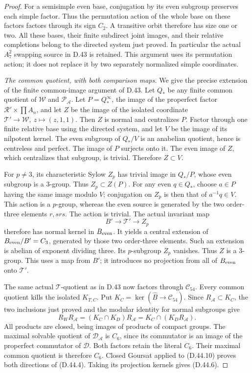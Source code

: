 \begin{proof}
For a semisimple even base, conjugation by its even
subgroup preserves each simple factor. Thus the
permutation action of the whole base on these factors
factors through its sign \(C_2\). A transitive orbit
therefore has size one or two. All these bases, their
finite subdirect joint images, and their relative
completions belong to the directed system just proved.
In particular the actual \(A_7^2\) swapping source in
D.43 is retained. This argument uses its permutation
action; it does not replace it by two separately
normalized simple coordinates.

\emph{The common quotient, with both comparison maps.}
We give the precise extension of the finite common-image
argument of D.43. Let \(Q_*\) be any finite common quotient
of \(\mathcal W\) and \(\mathcal P_{\mathscr A}\).
Let \(P=Q_*^\infty\), the image of the properfect
factor \(\mathcal R'\times\prod A_n\), and let \(Z\)
be the image of the isolated coordinate
\(\mathcal T'\to\mathcal W,\ z\mapsto(z,1,1)\).
Then \(Z\) is normal and centralizes \(P\).
Factor through one finite relative base using the
directed system, and let \(V\) be the image of its
nilpotent kernel. The even subgroup of \(Q_*/V\)
is an anabelian quotient, hence is centreless and
perfect. The image of \(P\) surjects onto it.
The even image of \(Z\), which centralizes that
subgroup, is trivial. Therefore \(Z\subset V\).

For \(p\ne3\), its characteristic Sylow \(Z_p\)
has trivial image in \(Q_*/P\), whose even subgroup
is a \(3\)-group. Thus \(Z_p\subset Z(P)\).
For any even \(q\in Q_*\), choose \(a\in P\)
having the same image modulo \(V\); conjugation
on \(Z_p\) is then that of \(a^{-1}q\in V\).
This action is a \(p\)-group, whereas the even
source is generated by the two order-three
elements \(r,srs\). The action is trivial.
The actual invariant map
\[
 B'\longrightarrow\mathcal T'\longrightarrow Z_p
\]
therefore has normal kernel in \(B_{\rm even}\).
It yields a central extension of
\(B_{\rm even}/B'=C_3\), generated by those two
order-three elements. Such an extension is
abelian of exponent dividing three. Its
\(p\)-subgroup \(Z_p\) vanishes. Thus \(Z\)
is a \(3\)-group. This uses a map from \(B'\);
it introduces no projection from all of
\(B_{\rm even}\) onto \(\mathcal T'\).

The same actual \(\mathcal T\)-quotient as in
D.43 now factors through \(\mathcal C_{54}\).
Every common quotient kills the isolated
\(K_{T,C}\). Put \(K_C=\ker(\widehat B\to
\mathcal C_{54})\). Since
\(R_{\mathscr A}\subset K_C\), the two
inclusions just proved and the modular
identity for normal subgroups give
\[
 R_W R_{\mathscr A}
   =(K_C\cap K_D)R_{\mathscr A}
   =K_C\cap(K_D R_{\mathscr A}).                               \tag{D.44.10}
\]
All products are closed, being images of
products of compact groups. The maximal
solvable quotient of \(\mathcal D_{\mathscr A}\)
is \(C_6\), since its commutator is an image
of the properfect commutator of \(\mathcal D\).
Both factors retain the literal \(C_6\).
Their maximal common quotient is therefore
\(C_6\). Closed Goursat applied to
(D.44.10) proves both directions of
(D.44.4). Taking its projection kernels
gives (D.44.6).


\end{proof}
